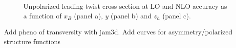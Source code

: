 \begin{figure}
    \centering
    \caption{Unpolarized leading-twist cross section at LO and NLO accuracy as a function of $x_B$ (panel a), $y$ (panel b) and $z_h$ (panel c).}
    \label{fig:plotNLOUUU}
\end{figure} 

Add pheno of transversity with jam3d. Add curves for asymmetry/polarized structure functions

\clearpage

